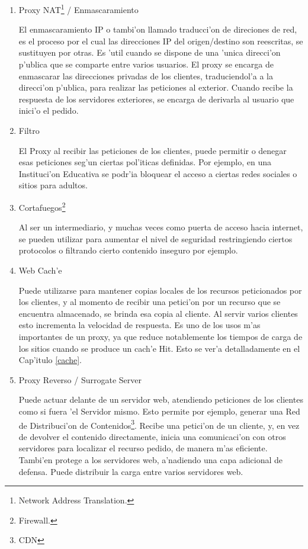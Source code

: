 \begin{enumerate}
\item Proxy NAT\footnote{Network Address Translation.} / Enmascaramiento

El enmascaramiento IP o tambi'on llamado traducci'on de direciones de red, es el proceso por el cual las direcciones IP del origen/destino son reescritas, se sustituyen por otras. Es 'util cuando se dispone de una 'unica direcci'on p'ublica que se comparte entre varios usuarios. El proxy se encarga de enmascarar las direcciones privadas de los clientes, traduciendol'a a la direcci'on p'ublica, para realizar las peticiones al exterior. Cuando recibe la respuesta de los servidores exteriores, se encarga de derivarla al usuario que inici'o el pedido.

\item Filtro

El Proxy al recibir las peticiones de los clientes, puede permitir o denegar esas peticiones seg'un ciertas pol'iticas definidas. Por ejemplo, en una Instituci'on Educativa se podr'ia bloquear el acceso a ciertas redes sociales o sitios para adultos.

\item Cortafuegos\footnote{Firewall.}

Al ser un intermediario, y muchas veces como puerta de acceso hacia internet, se pueden utilizar para aumentar el nivel de seguridad restringiendo ciertos protocolos o filtrando cierto contenido inseguro por ejemplo.

\item Web Cach'e

Puede utilizarse para mantener copias locales de los recursos peticionados por los clientes, y al momento de recibir una petici'on por un recurso que se encuentra almacenado, se brinda esa copia al cliente. Al servir varios clientes esto incrementa la velocidad de respuesta. Es uno de los usos m'as importantes de un proxy, ya que reduce notablemente los tiempos de carga de los sitios cuando se produce un cach'e Hit. Esto se ver'a detalladamente en el Cap'itulo \ref{cache}.

\item Proxy Reverso / Surrogate Server

Puede actuar delante de un servidor web, atendiendo peticiones de los clientes como si fuera 'el Servidor mismo. Esto permite por ejemplo, generar una Red de Distribuci'on de Contenidos\footnote{CDN}. Recibe una petici'on de un cliente, y, en vez de devolver el contenido directamente, inicia una comunicaci'on con otros servidores para localizar el recurso pedido, de manera m'as eficiente. Tambi'en protege a los servidores web, a'nadiendo una capa adicional de defensa. Puede distribuir la carga entre varios servidores web.


\end{enumerate}
